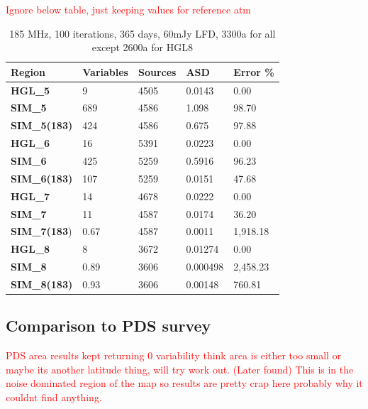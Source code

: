 \documentclass[a4paper]{article}
\begin{document}
\textcolor{red}{Ignore below table, just keeping values for reference atm}
\begin{table}[H]
    \centering
\begin{tabular}{lllll}
    \toprule
    \textbf{Region}	&	\textbf{Variables}	&	\textbf{Sources}	&	\textbf{ASD}	&	\textbf{Error \%}	\\ \midrule
    \textbf{HGL\_5}	&	9	&	4505	&	0.0143	&	0.00	\\
    \textbf{SIM\_5}	&	689	&	4586	&	1.098	&	98.70	\\
    \textbf{SIM\_5(183)}	&	424	&	4586	&	0.675	&	97.88	\\\midrule
    									
    \textbf{HGL\_6}	&	16	&	5391	&	0.0223	&	0.00	\\
    \textbf{SIM\_6}	&	425	&	5259	&	0.5916	&	96.23	\\
    \textbf{SIM\_6(183)}	&	107	&	5259	&	0.0151	&	47.68	\\\midrule
    									
    \textbf{HGL\_7}	&	14	&	4678	&	0.0222	&	0.00	\\
    \textbf{SIM\_7}	&	11	&	4587	&	0.0174	&	36.20	\\
    \textbf{SIM\_7(183})	&	0.67	&	4587	&	0.0011	&	1,918.18	\\\midrule
    \textbf{HGL\_8}	&	8	&	3672	&	0.01274	&	0.00	\\
    \textbf{SIM\_8}	&	0.89	&	3606	&	0.000498	&	2,458.23	\\
    \textbf{SIM\_8(183)}	&	0.93	&	3606	&	0.00148	&	760.81	\\\bottomrule
\end{tabular}
    \label{tab:Hp}
    \caption{185 MHz, 100 iterations, 365 days, 60mJy LFD, 3300a for all except 2600a for HGL8}
\end{table}

\subsection{Comparison to PDS survey}
\textcolor{red}{PDS area results kept returning 0 variability think area is either too small or maybe its another latitude thing, will try work out. (Later found) This is in the noise dominated region of the map so results are pretty crap here probably why it couldnt find anything.}
\end{document}

